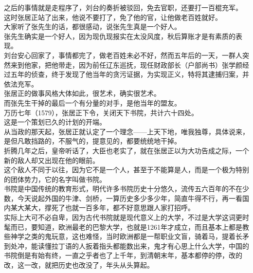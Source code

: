 \begin{multicols}{\theparacolNo}
之后的事情就是走程序了，刘台的奏折被驳回，免去官职，还要打一百棍充军。\\

这时张居正站了出来，他说不要打了，免了他的官，让他做老百姓就好。\\

大家听了张先生的话，都很感动，说张先生真是一个好人。\\

张先生确实是一个好人，因为现仇现报实在太没风度，秋后算账才是有素质的表现。\\

刘台安心回家了，事情都完了，做老百姓未必不好，然而五年后的一天，一群人突然来到他家，把他带走，因为前任辽东巡抚，现任财政部长（户部尚书）张学颜经过五年的侦查，终于发现了他当年的贪污证据，为实现正义，特将其逮捕归案，并依法充军。\\

张居正的做事风格大体如此，很艺术，确实很艺术。\\

而张先生干掉的最后一个有分量的对手，是他当年的盟友。\\

万历七年（1579），张居正下令，关闭天下书院，共计六十四处。\\

这是一个策划已久的计划的开端。\\

从当政的那天起，张居正就认定了一个理念——上天下地，唯我独尊，具体说来，是但凡敢挡路的，不服气的，提意见的，都要统统地干掉。\\

折腾几年之后，皇帝听话了，大臣也老实了，就在张居正以为大功告成之际，一个新的敌人却又出现在他的眼前。\\

这个敌人不同于以往，因为它不是一个人，甚至于不能算是人，而是一个极为特别的团体势力，它的名字叫做书院。\\

书院是中国传统的教育形式，明代许多书院历史十分悠久，流传五六百年的不在少数，今天说起外国的牛津、剑桥，一算历史多少多少年，简直牛得不行，再一看国内某大某大，撑死了也就一百多年，都不好意思跟人家打招呼。\\

实际上大可不必自卑，因为古代书院就是现代意义上的大学，不过是大学这词更时髦而已，要知道，欧洲最老的巴黎大学，也就是1261年才成立，而且基本上都是教些神学之类的鬼玩意，这也难怪，当时欧洲都是一帮职业文盲，骑着马，提着长矛到处冲，能读懂拉丁语的人扳着指头都能数出来，鬼才有心思上什么大学，中国的书院倒是有始有终，一直之乎者也了上千年，到清朝末年，基本都停的停，改的改，这一改，就把历史也改没了，年头从头算起。\\


\end{multicols}
